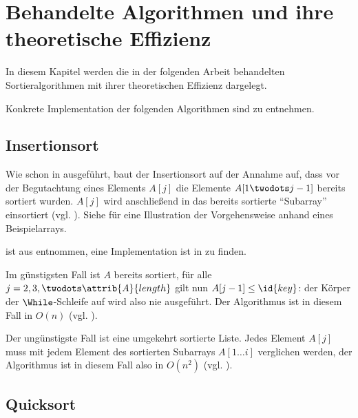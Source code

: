 \chapter{Behandelte Algorithmen und ihre theoretische Effizienz}
\label{cha:algorithmen}

In diesem Kapitel werden die in der folgenden Arbeit behandelten Sortieralgorithmen mit ihrer theoretischen Effizienz dargelegt.

Konkrete Implementation der folgenden Algorithmen sind  zu entnehmen.

\section{Insertionsort}
\label{sec:alg-insertion}

Wie schon in  ausgeführt, baut der Insertionsort auf der Annahme auf, dass vor der Begutachtung eines Elements $A[j]$ die Elemente $A[1 \twodots j - 1]$ bereits sortiert wurden. $A[j]$ wird anschließend in das bereits sortierte \enquote{Subarray} einsortiert (vgl. \cite[80]{taocp3}). Siehe  für eine Illustration der Vorgehensweise anhand eines Beispielarrays.





 ist aus \cite[18]{clrs2001} entnommen, eine Implementation ist in  zu finden.

Im günstigsten Fall ist $A$ bereits sortiert, für alle $j = 2, 3, \twodots \attrib{A}{length}$ gilt nun $A[j - 1] \leq \id{key}$: der Körper der $\While$-Schleife auf  wird also nie ausgeführt. Der Algorithmus ist in diesem Fall in $O(n)$ (vgl. \cite[28]{clrs2001}).

Der ungünstigste Fall ist eine umgekehrt sortierte Liste. Jedes Element $A[j]$ muss mit jedem Element des sortierten Subarrays $A[1 \ldots i]$ verglichen werden, der Algorithmus ist in diesem Fall also in $O(n^2)$ (vgl. \cite[28f]{clrs2001}).

\section{Quicksort}
\label{sec:alg-exchanging}

